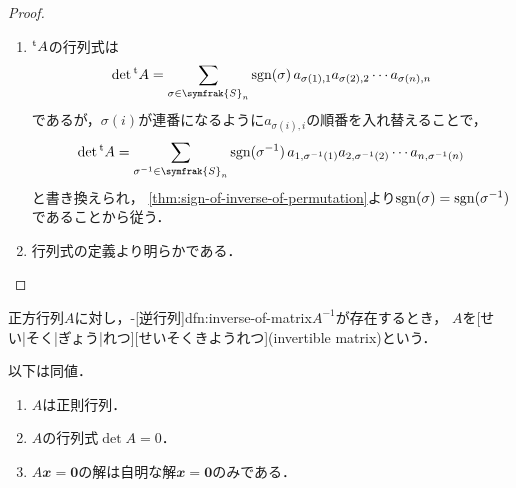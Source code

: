 \documentclass[../sotsu.tex]{subfiles}
\begin{document}
\begin{proof}
    \begin{enumerate}
        \item ${}^{\mathrm{t}}A$の行列式は
            \[  \det \tp{A} = \sum_{\sigma \in \symfrak{S}_n} \sgn(\sigma) \, a_{\sigma(1), 1} a_{\sigma(2), 2} \dotsm a_{\sigma(n), n}  \]
            であるが，$\sigma(i)$が連番になるように$a_{\sigma(i), i}$の順番を入れ替えることで，
            \[  \det \tp{A} = \sum_{\sigma^{-1} \in \symfrak{S}_n} \sgn(\sigma^{-1}) \, a_{1, \sigma^{-1}(1)} a_{2, \sigma^{-1}(2)} \dotsm a_{n, \sigma^{-1}(n)}  \]
            と書き換えられ，
            \cref{thm:sign-of-inverse-of-permutation}より$\operatorname{sgn}(\sigma) = \operatorname{sgn}(\sigma^{-1})$であることから従う．
        \item 行列式の定義より明らかである．
    \end{enumerate}
\end{proof}

\begin{definition}
    \label{dfn:invertible-matrix}
    正方行列$A$に対し，-[逆行列]{dfn:inverse-of-matrix}$A^{-1}$が存在するとき，
    $A$を[せい|そく|ぎょう|れつ][せいそくきようれつ](invertible matrix)という．
\end{definition}

\begin{proposition}
    以下は同値．
    \begin{enumerate}
        \item $A$は正則行列．
        \item $A$の行列式$\det A = 0$．
        \item $A 𝒙 = \symbf{0}$の解は自明な解$𝒙 = \symbf{0}$のみである．
    \end{enumerate}
\end{proposition}
\end{document}

